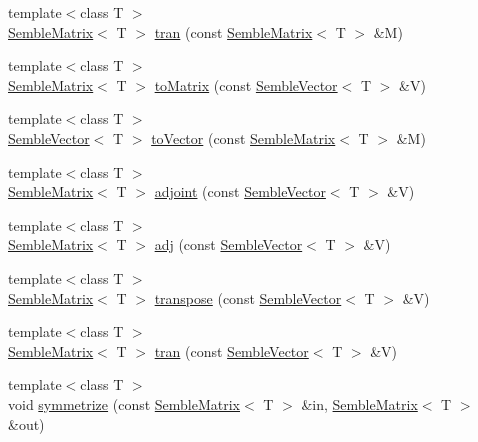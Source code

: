 \begin{DoxyCompactItemize}
\item 
{\footnotesize template$<$class T $>$ }\\\mbox{\hyperlink{structSEMBLE_1_1SembleMatrix}{Semble\+Matrix}}$<$ T $>$ \mbox{\hyperlink{namespaceSEMBLE_af9f50e2f55b0892ed274f7708cfc41ed}{tran}} (const \mbox{\hyperlink{structSEMBLE_1_1SembleMatrix}{Semble\+Matrix}}$<$ T $>$ \&M)
\item 
{\footnotesize template$<$class T $>$ }\\\mbox{\hyperlink{structSEMBLE_1_1SembleMatrix}{Semble\+Matrix}}$<$ T $>$ \mbox{\hyperlink{namespaceSEMBLE_aea4587cae7fab8901bd83a04f0b263be}{to\+Matrix}} (const \mbox{\hyperlink{structSEMBLE_1_1SembleVector}{Semble\+Vector}}$<$ T $>$ \&V)
\item 
{\footnotesize template$<$class T $>$ }\\\mbox{\hyperlink{structSEMBLE_1_1SembleVector}{Semble\+Vector}}$<$ T $>$ \mbox{\hyperlink{namespaceSEMBLE_a811b166e26b9746bb480e03012cafbaa}{to\+Vector}} (const \mbox{\hyperlink{structSEMBLE_1_1SembleMatrix}{Semble\+Matrix}}$<$ T $>$ \&M)
\item 
{\footnotesize template$<$class T $>$ }\\\mbox{\hyperlink{structSEMBLE_1_1SembleMatrix}{Semble\+Matrix}}$<$ T $>$ \mbox{\hyperlink{namespaceSEMBLE_ada777a6c4fd2b3433988da08715101a7}{adjoint}} (const \mbox{\hyperlink{structSEMBLE_1_1SembleVector}{Semble\+Vector}}$<$ T $>$ \&V)
\item 
{\footnotesize template$<$class T $>$ }\\\mbox{\hyperlink{structSEMBLE_1_1SembleMatrix}{Semble\+Matrix}}$<$ T $>$ \mbox{\hyperlink{namespaceSEMBLE_a0a1c6eb7fdedb22ed457c065bc2a73f1}{adj}} (const \mbox{\hyperlink{structSEMBLE_1_1SembleVector}{Semble\+Vector}}$<$ T $>$ \&V)
\item 
{\footnotesize template$<$class T $>$ }\\\mbox{\hyperlink{structSEMBLE_1_1SembleMatrix}{Semble\+Matrix}}$<$ T $>$ \mbox{\hyperlink{namespaceSEMBLE_a7caa0d962519a4fdf6e908c5ba1d7cb1}{transpose}} (const \mbox{\hyperlink{structSEMBLE_1_1SembleVector}{Semble\+Vector}}$<$ T $>$ \&V)
\item 
{\footnotesize template$<$class T $>$ }\\\mbox{\hyperlink{structSEMBLE_1_1SembleMatrix}{Semble\+Matrix}}$<$ T $>$ \mbox{\hyperlink{namespaceSEMBLE_a113160a11a40d47b91fc869bd652ca9f}{tran}} (const \mbox{\hyperlink{structSEMBLE_1_1SembleVector}{Semble\+Vector}}$<$ T $>$ \&V)
\item 
{\footnotesize template$<$class T $>$ }\\void \mbox{\hyperlink{namespaceSEMBLE_afc7414654c8245b4e08e751600252d4b}{symmetrize}} (const \mbox{\hyperlink{structSEMBLE_1_1SembleMatrix}{Semble\+Matrix}}$<$ T $>$ \&in, \mbox{\hyperlink{structSEMBLE_1_1SembleMatrix}{Semble\+Matrix}}$<$ T $>$ \&out)

\end{DoxyCompactItemize}
